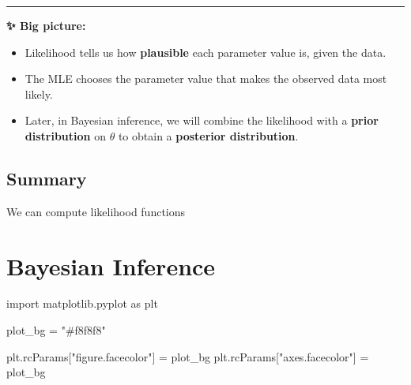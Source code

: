 \documentclass[
  letterpaper,
  DIV=11,
  numbers=noendperiod]{scrreprt}
\newenvironment{Shaded}{\begin{snugshade}}{\end{snugshade}}
\newcommand{\ImportTok}[1]{\textcolor[rgb]{0.00,0.46,0.62}{#1}}
\newcommand{\NormalTok}[1]{\textcolor[rgb]{0.00,0.23,0.31}{#1}}
\newcommand{\OperatorTok}[1]{\textcolor[rgb]{0.37,0.37,0.37}{#1}}
\newcommand{\StringTok}[1]{\textcolor[rgb]{0.13,0.47,0.30}{#1}}
\providecommand{\tightlist}{%
  \setlength{\itemsep}{0pt}\setlength{\parskip}{0pt}}
\theoremstyle{definition}
\theoremstyle{plain}
\theoremstyle{definition}
\theoremstyle{remark}
\begin{document}
\begin{center}\rule{0.5\linewidth}{0.5pt}\end{center}

\begin{tcolorbox}[enhanced jigsaw, left=2mm, colframe=quarto-callout-important-color-frame, toprule=.15mm, rightrule=.15mm, leftrule=.75mm, breakable, opacityback=0, arc=.35mm, colback=white, bottomrule=.15mm]

\vspace{-3mm}\textbf{✨ Big picture:}\vspace{3mm}

\begin{itemize}
\tightlist
\item
  Likelihood tells us how \textbf{plausible} each parameter value is,
  given the data.
\item
  The MLE chooses the parameter value that makes the observed data most
  likely.
\item
  Later, in Bayesian inference, we will combine the likelihood with a
  \textbf{prior distribution} on \(\theta\) to obtain a
  \textbf{posterior distribution}.
\end{itemize}

\end{tcolorbox}

\section{Summary}\label{summary}

We can compute likelihood functions

\chapter{Bayesian Inference}\label{sec-bayes-inference}

\begin{Shaded}
\begin{Highlighting}[]
\ImportTok{import}\NormalTok{ matplotlib.pyplot }\ImportTok{as}\NormalTok{ plt}

\NormalTok{plot\_bg }\OperatorTok{=} \StringTok{"\#f8f8f8"}

\NormalTok{plt.rcParams[}\StringTok{"figure.facecolor"}\NormalTok{] }\OperatorTok{=}\NormalTok{ plot\_bg}
\NormalTok{plt.rcParams[}\StringTok{"axes.facecolor"}\NormalTok{]   }\OperatorTok{=}\NormalTok{ plot\_bg}
\end{Highlighting}
\end{Shaded}
\end{document}
